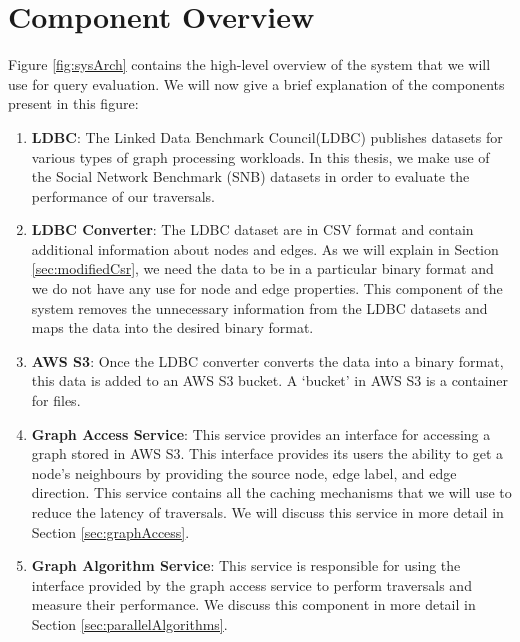 \section{Component Overview}\label{sec:componentOverview}
Figure \ref{fig:sysArch} contains the high-level overview of the system that
we will use for query evaluation. We will now give a brief explanation of the
components present in this figure:
\begin{enumerate}
    \item \textbf{LDBC}: The Linked Data Benchmark Council(LDBC) publishes datasets
        for various types of graph processing workloads. In this thesis, we make
        use of the Social Network Benchmark (SNB) datasets in order to evaluate
        the performance of our traversals.
    \item \textbf{LDBC Converter}: The LDBC dataset are in CSV format and
        contain additional information about nodes and edges. As we will explain
        in Section \ref{sec:modifiedCsr}, we need the data to be in a particular
        binary format and we do not have any use for node and edge properties.
        This component of the system removes the unnecessary information from
        the LDBC datasets and maps the data into the desired binary format.
    \item \textbf{AWS S3}: Once the LDBC converter converts the data into a
        binary format, this data is added to an AWS S3 bucket. A `bucket' in AWS S3
        is a container for files.
    \item \textbf{Graph Access Service}: This service provides an interface for
        accessing a graph stored in AWS S3. This interface provides its users
        the ability to get a node's neighbours by providing
        the source node, edge label, and edge direction. This service contains
        all the caching mechanisms that we will use to reduce the latency of
        traversals. We will discuss this service in more detail in
        Section \ref{sec:graphAccess}.
    \item \textbf{Graph Algorithm Service}: This service is responsible for
        using the interface provided by the graph access service to perform
        traversals and measure their performance. We discuss this component in
        more detail in Section \ref{sec:parallelAlgorithms}.
\end{enumerate}
